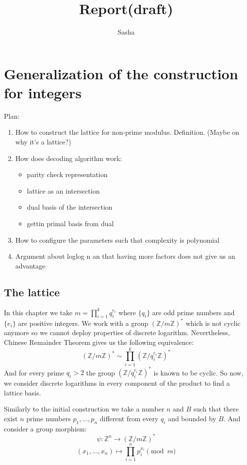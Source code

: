 \documentclass[12pt]{article}
\title{Report(draft)}
\author{ Sasha }
\newcommand{\zz}{\mathbb{Z}}
\begin{document}
\maketitle

\section{Generalization of the construction for integers}
Plan:
\begin{enumerate}
    \item How to construct the lattice for non-prime modulus. Definition. (Maybe on why it's a lattice?)
    \item How does decoding algorithm work:
    \begin{itemize}
        \item parity check representation
        \item lattice as an intersection
        \item dual basis of the intersection
        \item gettin primal basis from dual
    \end{itemize}
    \item How to configure the parameters such that complexity is polynomial
    \item Argument about loglog n an that having more factors does not give us an advantage
\end{enumerate}

\subsection{The lattice}
In this chapter we take $m = \prod_{i=1}^{k} q_{i}^{e_{i}}$ where $\{q_{i}\}$ are odd prime numbers and $\{e_{i}\}$ are positive integers. We work with a group $(\zz/m\zz)^*$ which is not cyclic anymore so we cannot deploy properties of discrete logarithm. Nevertheless, Chinese Remainder Theorem gives us the following equivalence:
\begin{equation}
    (\zz/m\zz)^* \sim \prod_{i=1}^{k}(\zz/q_{i}^{e_{i}}\zz)^*
\end{equation}
And for every prime $q_{i} > 2$ the group $(\zz/q_{i}^{e_{i}}\zz)^*$ is known to be cyclic. So now, we consider discrete logarithms in every component of the product to find a lattice basis.

Similarly to the initial construction we take a number $n$ and $B$ such that there exist $n$ prime numbers $p_{1}, ... , p_{n}$ different from every $q_{i}$ and bounded by $B$. And consider a group morphism:
\begin{equation}
    \psi : \zz^{n} \rightarrow (\zz/m\zz)^*
\end{equation}
\begin{equation}
    (x_{1}, ..., x_{n}) \mapsto \prod_{i=1}^{n}p_{i}^{x_{i}} \pmod{m}
\end{equation}
\end{document}
